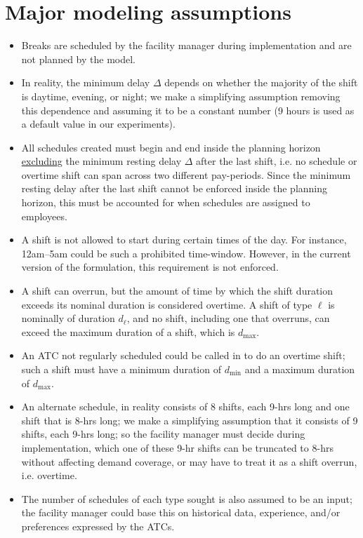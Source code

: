 \documentclass[11pt]{article}
\begin{document}
\section{Major modeling assumptions} 
\begin{itemize}
\item Breaks are scheduled by the facility manager during implementation and are not planned by the model. 

\item In reality, the minimum delay $\Delta$  depends on whether the majority of the shift is daytime, evening, or night; we make a simplifying assumption removing this dependence and assuming it to be a constant number (9 hours is used as a default value in our experiments).  

\item All schedules created must begin and end inside the planning horizon \underline{excluding} the minimum resting delay $\Delta$ after the last shift, i.e. no schedule or overtime shift can span across two different pay-periods. Since the minimum resting delay after the last shift cannot be enforced inside the planning horizon, this must be accounted for when schedules are assigned to employees. 

\item A shift is not allowed to start during certain  times of the day. For instance, 12am--5am could be such a prohibited time-window. However, in the current version of the formulation, this requirement is not enforced. 

\item A shift can overrun, but the amount of time by which the shift duration exceeds its nominal duration is considered overtime. A shift of type $\ell$ is nominally of duration $d_\ell$, and no shift, including one that overruns, can exceed the maximum duration of a shift, which is $d_{\max}$.

\item An ATC not regularly scheduled could be called in to do an overtime shift; such a shift must have a minimum duration of $d_{\min}$ and a maximum duration of $d_{\max}$. 

\item An alternate schedule, in reality consists of 8 shifts, each 9-hrs long and one shift that is 8-hrs long; we make a simplifying assumption that it consists of 9 shifts, each 9-hrs long; so the facility manager must decide during implementation, which one of these 9-hr shifts can be truncated to 8-hrs without affecting demand coverage, or may have to treat it as a shift overrun, i.e. overtime. 

\item The number of schedules of each type sought is also assumed to be an input; the facility manager could base this on historical data, experience, and/or preferences expressed by the ATCs. 

\end{itemize}
\end{document}
